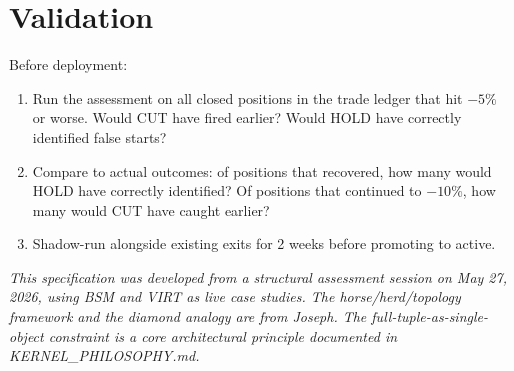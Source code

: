 \documentclass[11pt, a4paper]{article}
\begin{document}
\section{Validation}

Before deployment:
\begin{enumerate}
  \item Run the assessment on all closed positions in the trade ledger
        that hit $-5\%$ or worse. Would CUT have fired earlier? Would HOLD
        have correctly identified false starts?
  \item Compare to actual outcomes: of positions that recovered, how many
        would HOLD have correctly identified? Of positions that continued
        to $-10\%$, how many would CUT have caught earlier?
  \item Shadow-run alongside existing exits for 2 weeks before promoting
        to active.
\end{enumerate}

\vspace{2em}
\noindent\textit{This specification was developed from a structural assessment
session on May 27, 2026, using BSM and VIRT as live case studies. The
horse/herd/topology framework and the diamond analogy are from Joseph.
The full-tuple-as-single-object constraint is a core architectural
principle documented in KERNEL\_PHILOSOPHY.md.}
\end{document}
